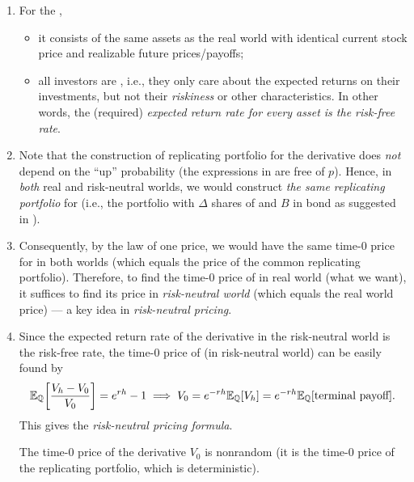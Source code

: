 \begin{enumerate}
\item For the ,
\begin{itemize}
\item it consists of the same assets as the real world with identical current
stock price and realizable future prices/payoffs;

\item all investors are , i.e., they only care about the
expected returns on their investments, but not their \emph{riskiness} or other
characteristics. In other words, the (required) \emph{expected return rate for
every asset is the risk-free rate}.
\end{itemize}

\item Note that the construction of replicating portfolio for the derivative
 does \emph{not} depend on the ``up'' probability (the
expressions in  are free of \(p\)). Hence, in
\emph{both} real and risk-neutral worlds, we would construct \emph{the same
replicating portfolio} for  (i.e., the portfolio with \(\Delta\)
shares of  and \(B\) in bond as suggested in
).

\item Consequently, by the law of one price, we would have the same time-0
price for  in both worlds (which equals the price of the common
replicating portfolio). Therefore, to find the time-0 price of 
in real world (what we want), it suffices to find its price in
\emph{risk-neutral world} (which equals the real world price) --- a key idea in
\emph{risk-neutral pricing}.

\item \label{it:rn-pricing-fmla-deriv}
Since the expected return rate of the derivative 
in the risk-neutral world is the risk-free rate, the time-0 price of
 (in risk-neutral world) can be easily found by
\[
\mathbb{E}_{\mathbb{Q}}\qty[\frac{V_h-V_0}{V_0}]=e^{rh}-1\implies
V_0=e^{-rh}\mathbb{E}_{\mathbb{Q}}\qty[V_h]
=e^{-rh}\mathbb{E}_{\mathbb{Q}}\qty[\text{terminal payoff}].
\]
This gives the \emph{risk-neutral pricing formula}.
\begin{note}
The time-0 price of the derivative \(V_0\) is nonrandom (it is the time-0
price of the replicating portfolio, which is deterministic).
\end{note}


\end{enumerate}
